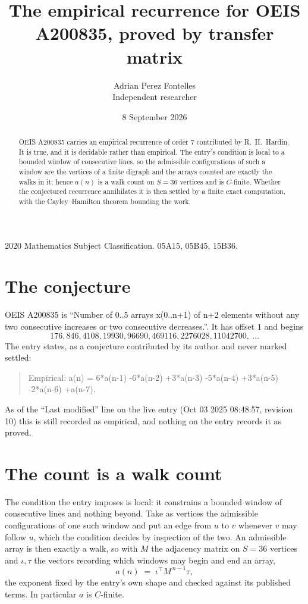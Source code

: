 \documentclass[11pt,a4paper]{article}
\title{The empirical recurrence for OEIS A200835, proved by transfer matrix}
\author{Adrian Perez Fontelles\\ \small Independent researcher}
\date{8 September 2026}
\theoremstyle{plain}
\theoremstyle{definition}
\begin{document}
\maketitle

\begin{abstract}
OEIS A200835 carries an empirical recurrence of order $7$ contributed by R.~H.~Hardin. It is
true, and it is decidable rather than empirical. The entry's condition is local to a bounded window of consecutive lines, so
the admissible configurations of such a window are the vertices of a finite digraph and the
arrays counted are exactly the walks in it; hence $a(n)$ is a walk count on $S=36$ vertices
and is $C$-finite. Whether the conjectured recurrence annihilates it is then settled by a
finite exact computation, with the Cayley--Hamilton theorem bounding the work.
\end{abstract}

\noindent\small 2020 Mathematics Subject Classification. 05A15, 05B45, 15B36.\normalsize

\section{The conjecture}

OEIS A200835 is ``Number of 0..5 arrays x(0..n+1) of n+2 elements without any two consecutive increases or two consecutive decreases.''. It has offset $1$ and begins
\[
176, 846, 4108, 19930, 96690, 469116, 2276028, 11042700,\ \dots
\]
The entry states, as a conjecture contributed by its author and never marked settled:
\begin{quote}
Empirical: a(n) = 6*a(n-1) -6*a(n-2) +3*a(n-3) -5*a(n-4) +3*a(n-5) -2*a(n-6) +a(n-7).
\end{quote}
As of the ``Last modified'' line on the live entry (Oct 03 2025 08:48:57, revision 10) this is still
recorded as empirical, and nothing on the entry records it as proved.

\section{The count is a walk count}

The condition the entry imposes is local: it constrains a bounded window of consecutive lines and nothing beyond. Take as
vertices the admissible configurations of one such window and put an edge from $u$ to $v$
whenever $v$ may follow $u$, which the condition decides by inspection of the two. An
admissible array is then exactly a walk, so with $M$ the adjacency matrix on $S=36$ vertices
and $\iota,\tau$ the vectors recording which windows may begin and end an array,
\[
a(n)\;=\;\iota^{\!\top}M^{\,n-1}\tau ,
\]
the exponent fixed by the entry's own shape and checked against its published terms. In
particular $a$ is $C$-finite.
\end{document}
